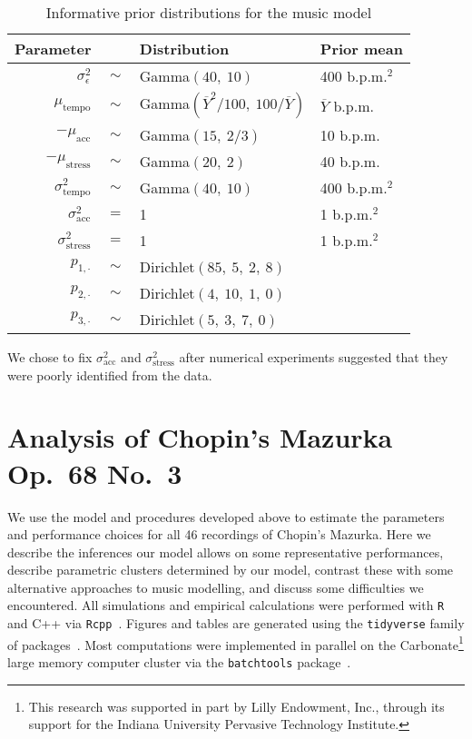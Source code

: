 \documentclass[12pt]{article}
\begin{document}
\begin{table}[t]
  \centering
  \begin{tabular}{@{}rcll@{}}
    \toprule
    Parameter & \phantom{a} & Distribution & Prior mean\\
    \midrule
    $\sigma^2_{\epsilon}$ & $\sim$ & Gamma$(40,\ 10)$ & 400 b.p.m.$^2$\\
    $\mu_{\textrm{tempo}}$ & $\sim$ & Gamma$(\overline{Y}^2/100,\ 100
                                      /\overline{Y})$ & $\overline{Y}$
                                                        b.p.m.\\
    $-\mu_{\textrm{acc}} $ & $\sim$ & Gamma$(15,\ 2/3)$ & 10 b.p.m.\\
    $-\mu_{\textrm{stress}} $ & $\sim$ & Gamma$(20,\ 2)$ & 40 b.p.m.\\
    $\sigma^2_{\textrm{tempo}} $ & $\sim$ & Gamma$(40,\ 10)$ & 400
                                                               b.p.m.$^2$\\
    $\sigma^2_{\textrm{acc}} $ & $=$ & 1 & 1 b.p.m.$^2$\\
    $\sigma^2_{\textrm{stress}} $ & $=$ & 1 & 1 b.p.m.$^2$\\
    $p_{1,\cdot}$ & $\sim$ & Dirichlet$(85,\ 5,\ 2,\ 8)$ \\
    $p_{2,\cdot}$ & $\sim$ & Dirichlet$(4,\ 10,\ 1,\ 0)$ \\
    $p_{3,\cdot}$ & $\sim$ & Dirichlet$(5,\ 3,\ 7,\ 0)$ \\
    \bottomrule
  \end{tabular}
  \caption{Informative prior distributions for the music model}
  \label{tab:priors}
\end{table}
We chose to fix $\sigma^2_{\textrm{acc}}$ and
$\sigma^2_{\textrm{stress}}$ after numerical experiments suggested
that they were poorly identified from the data.


\section{Analysis of Chopin's Mazurka Op.\ 68 No.\ 3}
\label{sec:analys-chop-mazurka}

We use the model and procedures developed above to estimate the
parameters and performance choices for all 46 recordings of Chopin's
Mazurka. Here we describe the inferences our model allows on some
representative performances, describe parametric clusters determined
by our model, contrast these with some alternative approaches to music
modelling, and discuss some difficulties we encountered. All simulations and empirical calculations were performed with
\texttt{R}~\citep{R-Core-Team2019} and C++ via \texttt{Rcpp}~\citep{Eddelbuettel2013}. Figures and tables are generated
using the \texttt{tidyverse} family of
packages~\citep{Wickham2017, Wickham2016}.
Most
computations were implemented in parallel on the Carbonate\footnote{This research was supported in part by Lilly Endowment, Inc., through its support for the Indiana University Pervasive Technology Institute.} large
memory computer cluster via
the \texttt{batchtools} package~\citep{LangBischl2017}. 
\end{document}
